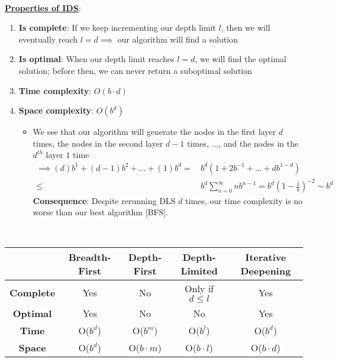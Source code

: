 \documentclass[12pt]{extarticle}
\theoremstyle{definition}
\theoremstyle{remark}
\newcommand{\titleul}[1]{\noindent \textbf{\ul{#1}}}
\begin{document}
~\\
\titleul{Properties of IDS}: \begin{enumerate}
    \item \textbf{Is complete}: If we keep incrementing our depth limit $l$, then we will eventually reach $l=d\implies$ our algorithm will find a solution
    \item \textbf{Is optimal}: When our depth limit reaches $l=d$, we will find the optimal solution; before then, we can never return a suboptimal solution
    \item \textbf{Time complexity}: $O(b\cdot d)$
    \item \textbf{Space complexity}: $O(b^d)$ \begin{itemize}
        \item We see that our algorithm will generate the nodes in the first layer $d$ times, the nodes in the second layer $d-1$ times, $\hdots$, and the nodes in the $d^{th}$ layer $1$ time \begin{align*}
            \implies (d)b^1+(d-1)b^2+\hdots+(1)b^d=&\,b^d(1+2b^{-1}+\hdots+db^{1-d})\\
            \leq&\,b^d\sum_{n=0}^\infty nb^{n-1}=b^d\left(1-\frac{1}{b}\right)^{-2}\sim b^d
        \end{align*}
        \textbf{Consequence}: Despite rerunning DLS $d$ times, our time complexity is no worse than our best algorithm [BFS].
    \end{itemize}
\end{enumerate}

~\\
\begin{tabular}{|c|c|c|c|c|}
    \hline \cellcolor{black!60} & \textbf{Breadth-First} & \textbf{Depth-First} & \textbf{Depth-Limited} & \textbf{Iterative Deepening}  \\ \hline
    \textbf{Complete} & \cellcolor{green!60!black!40!white} Yes & \cellcolor{red!60!black!40!white} No & \cellcolor{red!60!black!40!white} Only if $d\leq l$ & \cellcolor{green!60!black!40!white} Yes \\ \hline
    \textbf{Optimal} & \cellcolor{green!60!black!40!white} Yes & \cellcolor{red!60!black!40!white} No & \cellcolor{red!60!black!40!white} No & \cellcolor{green!60!black!40!white} Yes \\ \hline
    \textbf{Time} & \cellcolor{green!60!black!40!white} O($b^d$) & \cellcolor{red!60!black!40!white} O($b^m$) & \cellcolor{green!60!black!40!white} O($b^l$) & \cellcolor{green!60!black!40!white} O($b^d$) \\ \hline
    \textbf{Space} & \cellcolor{red!60!black!40!white} O($b^d$) & \cellcolor{green!60!black!40!white} O($b\cdot m$) & \cellcolor{green!60!black!40!white} O($b\cdot l$) & \cellcolor{green!60!black!40!white} O($b\cdot d$) \\ \hline
\end{tabular}
\end{document}
